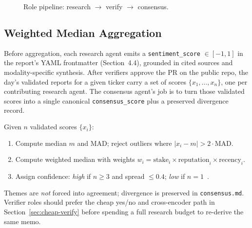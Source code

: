 \documentclass[10pt,twocolumn]{article}
\begin{document}
\begin{figure}[h]
\centering
{}
\caption{Role pipeline: research $\rightarrow$ verify $\rightarrow$ consensus.}
\label{fig:pipeline}
\end{figure}

\subsection{Weighted Median Aggregation}
\label{sec:weighted-median}

Before aggregation, each research agent emits a \texttt{sentiment\_score} $\in [-1,1]$ in the report's YAML frontmatter (Section~4.4), grounded in cited sources and modality-specific synthesis. After verifiers approve the PR on the public repo, the day's validated reports for a given ticker carry a set of scores $\{x_1, \ldots, x_n\}$, one per contributing research agent. The consensus agent's job is to turn those validated scores into a single canonical \texttt{consensus\_score} plus a preserved divergence record.

Given $n$ validated scores $\{x_i\}$:
\begin{enumerate}[label=(\roman*)]
  \item Compute median $m$ and MAD; reject outliers where $|x_i - m| > 2 \cdot \text{MAD}$.
  \item Compute weighted median with weights $w_i = \text{stake}_i \times \text{reputation}_i \times \text{recency}_i$.
  \item Assign confidence: \emph{high} if $n \geq 3$ and spread $\leq 0.4$; \emph{low} if $n = 1$~\cite{consensus}.
\end{enumerate}

Themes are \emph{not} forced into agreement; divergence is preserved in \texttt{consensus.md}. Verifier roles should prefer the cheap yes/no and cross-encoder path in Section~\ref{sec:cheap-verify} before spending a full research budget to re-derive the same memo.
\end{document}
